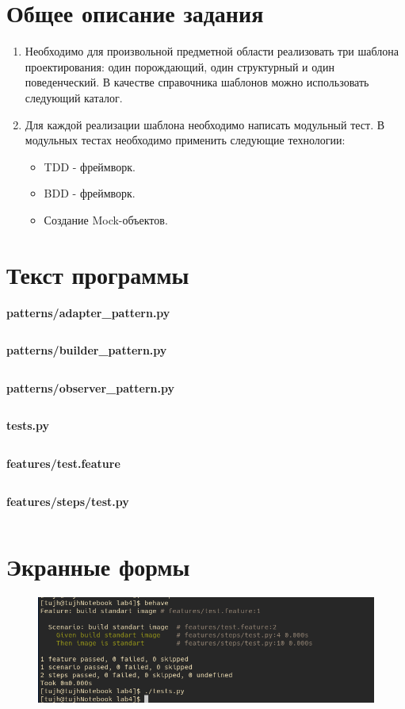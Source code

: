\documentclass[20pt,a4paper]{report}
\begin{document}
	\chapter{Общее описание задания}
		\large
		\begin{enumerate}
			\item Необходимо для произвольной предметной области реализовать три шаблона проектирования: один порождающий, один структурный и один поведенческий. В качестве справочника шаблонов можно использовать следующий каталог.
			\item Для каждой реализации шаблона необходимо написать модульный тест. В модульных тестах необходимо применить следующие технологии: \\
			\begin{itemize}
				\item TDD - фреймворк.
				\item BDD - фреймворк.
				\item Создание Mock-объектов.
			\end{itemize}
		\end{enumerate}

	\chapter{Текст программы}
		\qquad \textbf{patterns/adapter\_pattern.py} \\
		\small
		\inputminted[tabsize=4, linenos]{python}{patterns/adapter_pattern.py}
		\large
		\qquad \textbf{patterns/builder\_pattern.py} \\
		\small
		\inputminted[tabsize=4, linenos]{python}{patterns/builder_pattern.py}
		\large
		\qquad \textbf{patterns/observer\_pattern.py} \\
		\small
		\inputminted[tabsize=4, linenos]{python}{patterns/observer_pattern.py}
		\large

		\qquad \textbf{tests.py} \\
		\small
		\inputminted[tabsize=4, linenos]{python}{tests.py}
		\large
		
		\qquad \textbf{features/test.feature} \\
		\small
		\inputminted[tabsize=4, linenos]{python}{features/test.feature}
		\large

		\qquad \textbf{features/steps/test.py} \\
		\small
		\inputminted[tabsize=4, linenos]{python}{features/steps/test.py}
		\large

		\chapter{Экранные формы}
		\begin{figure}[H]
			\centering
			\includegraphics[scale=0.8]{11.png}
		\end{figure}
\end{document}
